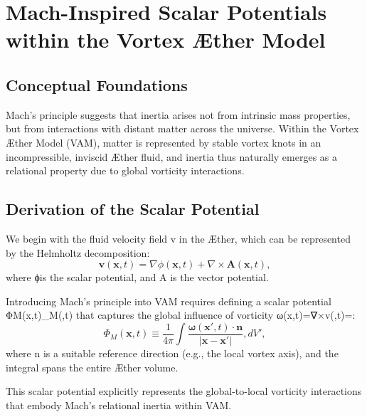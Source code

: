 \documentclass[aps,preprint,superscriptaddress]{revtex4-2}
\begin{document}

\section{Mach-Inspired Scalar Potentials within the Vortex Æther Model}


\subsection{Conceptual Foundations}
Mach's principle suggests that inertia arises not from intrinsic mass properties, but from interactions with distant matter across the universe. Within the Vortex Æther Model (VAM), matter is represented by stable vortex knots in an incompressible, inviscid Æther fluid, and inertia thus naturally emerges as a relational property due to global vorticity interactions.


\subsection{Derivation of the Scalar Potential}
We begin with the fluid velocity field v in the Æther, which can be represented by the Helmholtz decomposition:
\begin{equation}
\mathbf{v}(\mathbf{x}, t) = \nabla \phi(\mathbf{x}, t) + \nabla \times \mathbf{A}(\mathbf{x}, t),
\end{equation}
where ϕ\phi is the scalar potential, and A is the vector potential.


Introducing Mach's principle into VAM requires defining a scalar potential ΦM(x,t)\Phi_M(,t) that captures the global influence of vorticity ω(x,t)=∇×v\boldsymbol{\omega}(,t)=\nabla \times {}:
\begin{equation}
\Phi_M(\mathbf{x}, t) \equiv \frac{1}{4\pi} \int \frac{\boldsymbol{\omega}(\mathbf{x}',t)\cdot\mathbf{n}}{|\mathbf{x}-\mathbf{x}'|}, dV',
\end{equation}
where n is a suitable reference direction (e.g., the local vortex axis), and the integral spans the entire Æther volume.


This scalar potential explicitly represents the global-to-local vorticity interactions that embody Mach's relational inertia within VAM.
\end{document}

